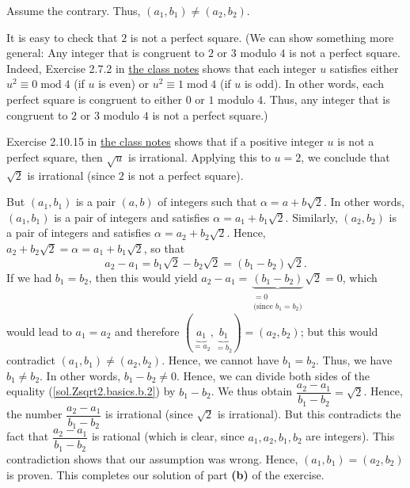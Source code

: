 \documentclass[paper=a4, fontsize=12pt]{scrartcl}%
\theoremstyle{plainsl}
\theoremstyle{definition}
\theoremstyle{remark}
\begin{document}
Assume the contrary. Thus, $\left(  a_{1},b_{1}\right)  \neq\left(
a_{2},b_{2}\right)  $.

It is easy to check that $2$ is not a perfect square. (We can show something
more general: Any integer that is congruent to $2$ or $3$ modulo $4$ is not a
perfect square. Indeed, Exercise 2.7.2 in
\href{http://www-users.math.umn.edu/~dgrinber/19s/notes.pdf}{the class notes}
shows that each integer $u$ satisfies either $u^{2}\equiv0\operatorname{mod}4$
(if $u$ is even) or $u^{2}\equiv1\operatorname{mod}4$ (if $u$ is odd). In
other words, each perfect square is congruent to either $0$ or $1$ modulo $4$.
Thus, any integer that is congruent to $2$ or $3$ modulo $4$ is not a perfect square.)

Exercise 2.10.15 in
\href{http://www-users.math.umn.edu/~dgrinber/19s/notes.pdf}{the class notes}
shows that if a positive integer $u$ is not a perfect square, then $\sqrt{u}$
is irrational. Applying this to $u=2$, we conclude that $\sqrt{2}$ is
irrational (since $2$ is not a perfect square).

But $\left(  a_{1},b_{1}\right)  $ is a pair $\left(  a,b\right)  $ of
integers such that $\alpha=a+b\sqrt{2}$. In other words, $\left(  a_{1}%
,b_{1}\right)  $ is a pair of integers and satisfies $\alpha=a_{1}+b_{1}%
\sqrt{2}$. Similarly, $\left(  a_{2},b_{2}\right)  $ is a pair of integers and
satisfies $\alpha=a_{2}+b_{2}\sqrt{2}$. Hence, $a_{2}+b_{2}\sqrt{2}%
=\alpha=a_{1}+b_{1}\sqrt{2}$, so that%
\begin{equation}
a_{2}-a_{1}=b_{1}\sqrt{2}-b_{2}\sqrt{2}=\left(  b_{1}-b_{2}\right)  \sqrt{2}.
\label{sol.Zsqrt2.basics.b.2}%
\end{equation}
If we had $b_{1}=b_{2}$, then this would yield $a_{2}-a_{1}%
=\underbrace{\left(  b_{1}-b_{2}\right)  }_{\substack{=0\\\text{(since }%
b_{1}=b_{2}\text{)}}}\sqrt{2}=0$, which would lead to $a_{1}=a_{2}$ and
therefore $\left(  \underbrace{a_{1}}_{=a_{2}},\underbrace{b_{1}}_{=b_{2}%
}\right)  =\left(  a_{2},b_{2}\right)  $; but this would contradict $\left(
a_{1},b_{1}\right)  \neq\left(  a_{2},b_{2}\right)  $. Hence, we cannot have
$b_{1}=b_{2}$. Thus, we have $b_{1}\neq b_{2}$. In other words, $b_{1}%
-b_{2}\neq0$. Hence, we can divide both sides of the equality
(\ref{sol.Zsqrt2.basics.b.2}) by $b_{1}-b_{2}$. We thus obtain $\dfrac
{a_{2}-a_{1}}{b_{1}-b_{2}}=\sqrt{2}$. Hence, the number $\dfrac{a_{2}-a_{1}%
}{b_{1}-b_{2}}$ is irrational (since $\sqrt{2}$ is irrational). But this
contradicts the fact that $\dfrac{a_{2}-a_{1}}{b_{1}-b_{2}}$ is rational
(which is clear, since $a_{1},a_{2},b_{1},b_{2}$ are integers). This
contradiction shows that our assumption was wrong. Hence, $\left(  a_{1}%
,b_{1}\right)  =\left(  a_{2},b_{2}\right)  $ is proven. This completes our
solution of part \textbf{(b)} of the exercise.\\[0.4cm]
\end{document}
